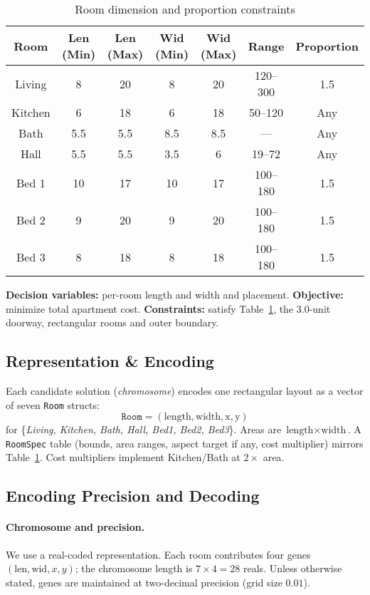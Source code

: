 \documentclass{article}
\begin{document}
\begin{table}[H]
\centering
\caption{Room dimension and proportion constraints}
\label{tab:floorplan_constraints}
\begin{tabular}{|c|c|c|c|c|c|c|}
\hline
\textbf{Room} & \textbf{Len (Min)} & \textbf{Len (Max)} & \textbf{Wid (Min)} & \textbf{Wid (Max)} & \textbf{Range} & \textbf{Proportion} \\ \hline
Living  & 8  & 20  & 8  & 20  & 120--300 & 1.5 \\ \hline
Kitchen & 6  & 18  & 6  & 18  & 50--120  & Any \\ \hline
Bath    & 5.5 & 5.5 & 8.5 & 8.5 & ---      & Any \\ \hline
Hall    & 5.5 & 5.5 & 3.5 & 6   & 19--72   & Any \\ \hline
Bed 1   & 10 & 17  & 10 & 17  & 100--180 & 1.5 \\ \hline
Bed 2   & 9  & 20  & 9  & 20  & 100--180 & 1.5 \\ \hline
Bed 3   & 8  & 18  & 8  & 18  & 100--180 & 1.5 \\ \hline
\end{tabular}
\end{table}

\noindent\textbf{Decision variables:} per-room length and width and placement. \quad
\textbf{Objective:} minimize total apartment cost. \quad
\textbf{Constraints:} satisfy Table~\ref{tab:floorplan_constraints}, the 3.0-unit doorway, rectangular rooms and outer boundary.

\subsection{Representation \& Encoding}
Each candidate solution (\emph{chromosome}) encodes one rectangular layout as a vector of seven \texttt{Room} structs:
\[
\texttt{Room} = (\text{length}, \text{width}, \text{x}, \text{y})
\]
for \{\textit{Living, Kitchen, Bath, Hall, Bed1, Bed2, Bed3}\}. Areas are $\text{length}\times\text{width}$. A \texttt{RoomSpec} table (bounds, area ranges, aspect target if any, cost multiplier) mirrors Table~\ref{tab:floorplan_constraints}. Cost multipliers implement Kitchen/Bath at $2\times$ area.

\subsection{Encoding Precision and Decoding}
\paragraph{Chromosome and precision.}
We use a real-coded representation. Each room contributes four genes $(\text{len},\text{wid},x,y)$; the chromosome length is $7\times4=28$ reals. Unless otherwise stated, genes are maintained at two-decimal precision (grid size $0.01$).
\end{document}
